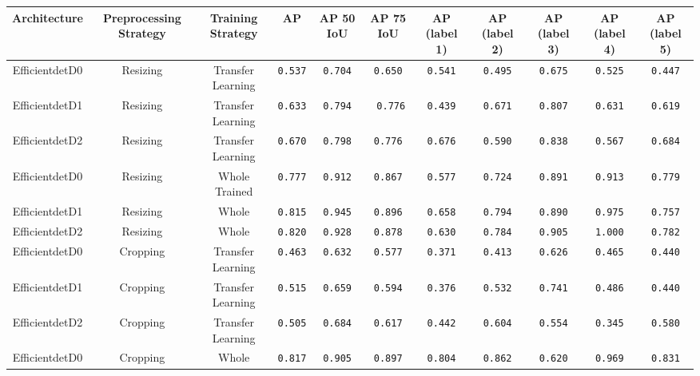 \documentclass[openright]{normas-utf-tex} %
\begin{document}
\begin{table}[H]
	\centering
	\begin{adjustbox}{width=1\textwidth}
	\label{tab:modelPerformance}
	\begin{tabular}{c|c|c|c|c|c|c|c|c|c|c}
		\hline 
		Architecture & Preprocessing Strategy & Training Strategy & AP & AP 50 IoU & AP 75 IoU & AP (label 1) & AP (label 2) & AP (label 3) & AP (label 4) & AP (label 5) \\
		\hline
        Efficientdet\-D0 & Resizing & Transfer Learning & \texttt{0.537} & \texttt{0.704} & \texttt{0.650} & \texttt{0.541} & \texttt{0.495} & \texttt{0.675} & \texttt{0.525} & \texttt{0.447} \\
		Efficientdet\-D1 & Resizing & Transfer Learning & \texttt{0.633} & \texttt{0.794} & \texttt{ 0.776} & \texttt{0.439} & \texttt{0.671} & \texttt{0.807} & \texttt{0.631} & \texttt{0.619} \\
		Efficientdet\-D2 & Resizing & Transfer Learning & \texttt{0.670} & \texttt{0.798} & \texttt{0.776} & \texttt{0.676} & \texttt{0.590} & \texttt{0.838} & \texttt{0.567} & \texttt{0.684} \\
		Efficientdet\-D0 & Resizing & Whole Trained & \texttt{0.777} & \texttt{0.912} & \texttt{0.867} & \texttt{0.577} & \texttt{0.724} & \texttt{0.891} & \texttt{0.913} & \texttt{0.779} \\
		Efficientdet\-D1 & Resizing & Whole & \texttt{0.815} & \texttt{0.945} & \texttt{0.896} & \texttt{0.658} & \texttt{0.794} & \texttt{0.890} & \texttt{0.975} & \texttt{0.757} \\
		Efficientdet\-D2 & Resizing & Whole & \texttt{0.820} & \texttt{0.928} & \texttt{0.878} & \texttt{0.630} & \texttt{0.784} & \texttt{0.905} & \texttt{1.000} & \texttt{0.782} \\
		Efficientdet\-D0 & Cropping & Transfer Learning & \texttt{0.463} & \texttt{0.632} & \texttt{0.577} & \texttt{0.371} & \texttt{0.413} & \texttt{0.626} & \texttt{0.465} & \texttt{0.440} \\
		Efficientdet\-D1 & Cropping & Transfer Learning & \texttt{0.515} & \texttt{0.659} & \texttt{0.594} & \texttt{0.376} & \texttt{0.532} & \texttt{0.741} & \texttt{0.486} & \texttt{0.440} \\
		Efficientdet\-D2 & Cropping & Transfer Learning & \texttt{0.505} & \texttt{0.684} & \texttt{0.617} & \texttt{0.442} & \texttt{0.604} & \texttt{0.554} & \texttt{0.345} & \texttt{0.580} \\
		Efficientdet\-D0 & Cropping & Whole & \texttt{0.817} & \texttt{0.905} & \texttt{0.897} & \texttt{0.804} & \texttt{0.862} & \texttt{0.620} & \texttt{0.969} & \texttt{0.831} \\

\end{tabular}
\end{adjustbox}
\end{table}
\end{document}

